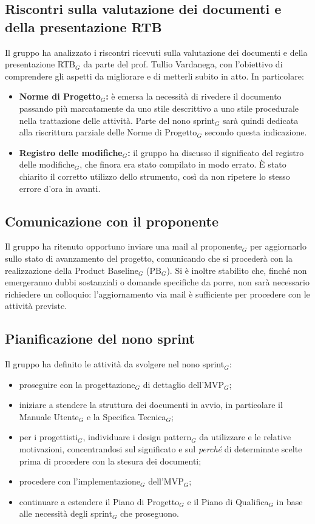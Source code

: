 \documentclass[a4paper, 10pt, colorlinks=true, linkcolor=black, urlcolor=blue, citecolor=blue, hidelinks]{article}
\begin{document}
\subsection{Riscontri sulla valutazione dei documenti e della presentazione RTB}
Il gruppo ha analizzato i riscontri ricevuti sulla valutazione dei documenti e della presentazione RTB$_G$ da parte del prof. Tullio Vardanega, con l'obiettivo di comprendere gli aspetti da migliorare e di metterli subito in atto. In particolare:
\begin{itemize}
    \item \textbf{Norme di Progetto$_G$:} è emersa la necessità di rivedere il documento passando più marcatamente da uno stile descrittivo a uno stile procedurale nella trattazione delle attività. Parte del nono sprint$_G$ sarà quindi dedicata alla riscrittura parziale delle Norme di Progetto$_G$ secondo questa indicazione.
    \item \textbf{Registro delle modifiche$_G$:} il gruppo ha discusso il significato del registro delle modifiche$_G$, che finora era stato compilato in modo errato. È stato chiarito il corretto utilizzo dello strumento, così da non ripetere lo stesso errore d'ora in avanti.
\end{itemize}

\subsection{Comunicazione con il proponente}
Il gruppo ha ritenuto opportuno inviare una mail al proponente$_G$ per aggiornarlo sullo stato di avanzamento del progetto, comunicando che si procederà con la realizzazione della Product Baseline$_G$ (PB$_G$). Si è inoltre stabilito che, finché non emergeranno dubbi sostanziali o domande specifiche da porre, non sarà necessario richiedere un colloquio: l'aggiornamento via mail è sufficiente per procedere con le attività previste.

\subsection{Pianificazione del nono sprint}
Il gruppo ha definito le attività da svolgere nel nono sprint$_G$:
\begin{itemize}
    \item proseguire con la progettazione$_G$ di dettaglio dell'MVP$_G$;
    \item iniziare a stendere la struttura dei documenti in avvio, in particolare il Manuale Utente$_G$ e la Specifica Tecnica$_G$;
    \item per i progettisti$_G$, individuare i design pattern$_G$ da utilizzare e le relative motivazioni, concentrandosi sul significato e sul \emph{perché} di determinate scelte prima di procedere con la stesura dei documenti;
    \item procedere con l'implementazione$_G$ dell'MVP$_G$;
    \item continuare a estendere il Piano di Progetto$_G$ e il Piano di Qualifica$_G$ in base alle necessità degli sprint$_G$ che proseguono.
\end{itemize}
\end{document}
